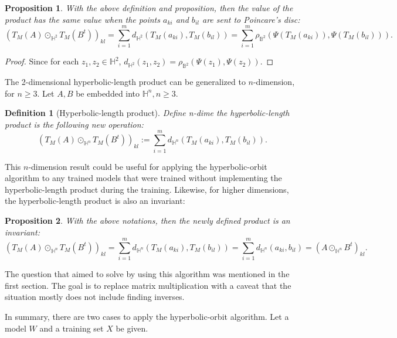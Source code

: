 \documentclass{article}
\theoremstyle{plain}
\theoremstyle{plain} %
\newtheorem{proposition}{Proposition}
\newtheorem{definition}[theorem]{Definition}
\theoremstyle{definition}  %
\theoremstyle{remark}  %
\theoremstyle{plain}
\begin{document}
\begin{proposition}
With the above definition and proposition, then the value of the product has the same value when the points $a_{ki}$ and $b_{il}$ are sent to Poincare's disc:
$$
\left( T_M(A) \odot_{\mathbb{H}^2} T_M(B^t)\right)_{kl} = \sum\limits_{i=1}^m d_{\mathbb{H}^2} \left(T_M \left( a_{ki} \right) ,T_M\left( b_{il}\right) \right)
=  \sum\limits_{i=1}^m \rho_{\mathbb{B}^2} \left(\Psi \left(T_M \left( a_{ki} \right)\right) ,\Psi\left( T_M\left( b_{il}\right) \right)\right) .$$
\end{proposition}
\begin{proof}
Since for each $z_1,z_2\in\mathbb{H}^2$, $d_{\mathbb{H}^2}(z_1,z_2)=\rho_{\mathbb{B}^2}(\Psi(z_1),\Psi(z_2)).$
\end{proof}

The 2-dimensional hyperbolic-length product can be generalized to $n$-dimension\cite{MR1138441, MR725161, beardon2012geometry, MR2402415, MR4221225, MR1893917}, for $n\geq 3$. Let $A, B$ be embedded into $\mathbb{H}^n, n\geq 3.$
\begin{definition}[Hyperbolic-length product]
Define \textit{n-dime the hyperbolic-length product} is the following new operation:
$$
\left( T_M(A) \odot_{\mathbb{H}^n} T_M(B^t)\right)_{kl} := \sum\limits_{i=1}^m d_{\mathbb{H}^n} \left(T_M \left( a_{ki} \right) ,T_M\left( b_{il}\right) \right).
$$
\end{definition}
This $n$-dimension result could be useful for applying the hyperbolic-orbit algorithm to any trained models that were trained without implementing the hyperbolic-length product during the training.
Likewise, for higher dimensions, the hyperbolic-length product is also an invariant:
\begin{proposition}
With the above notations, then the newly defined product is an invariant:
$$
\left( T_M(A) \odot_{\mathbb{H}^n} T_M(B^t)\right)_{kl} = \sum\limits_{i=1}^m d_{\mathbb{H}^n} \left(T_M \left( a_{ki} \right) ,T_M\left( b_{il}\right) \right)
=  \sum\limits_{i=1}^m d_{\mathbb{H}^n} \left( a_{ki}  , b_{il} \right)  =\left( A\odot_{\mathbb{H}^n} B^t\right)_{kl}.$$
\end{proposition}

The question that aimed to solve by using this algorithm was mentioned in the first section. The goal is to replace matrix multiplication with a caveat that the situation mostly does not include finding inverses.

In summary, there are two cases to apply the hyperbolic-orbit algorithm. Let a model $W$ and a training set $X$ be given.
\end{document}
